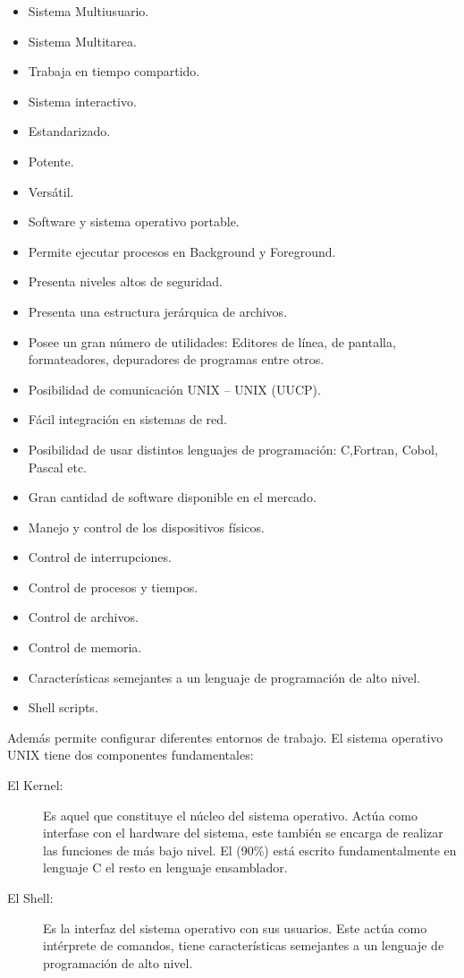\begin{itemize}
	\item Sistema Multiusuario.
	\item Sistema Multitarea.
	\item Trabaja en tiempo compartido.
	\item Sistema interactivo.
	\item Estandarizado.
	\item Potente.
	\item Versátil.
	\item Software y sistema operativo portable.
	\item Permite ejecutar procesos en Background y Foreground.
	\item Presenta niveles altos de seguridad.
	\item Presenta una estructura jerárquica de archivos.
	\item Posee un gran número de utilidades: Editores de línea, de pantalla, formateadores, depuradores de programas entre otros.
	\item Posibilidad de comunicación UNIX – UNIX (UUCP).
	\item Fácil integración en sistemas de red.
	\item Posibilidad de usar distintos lenguajes de programación: C,Fortran, Cobol, Pascal etc.
	\item Gran cantidad de software disponible en el mercado.
	\item Manejo y control de los dispositivos físicos.
	\item Control de interrupciones.
	\item Control de procesos y tiempos.
	\item Control de archivos.
	\item Control de memoria.
	\item Características semejantes a un lenguaje de programación de alto nivel.
	\item Shell scripts.
\end{itemize}

Además permite configurar diferentes entornos de trabajo. El sistema operativo UNIX tiene dos componentes fundamentales:
\begin{description}
	\item[El Kernel:] Es aquel que constituye el núcleo del sistema operativo. Actúa como interfase con el hardware del sistema, este también se encarga de realizar las funciones 
							de más bajo nivel. El (90\%) está escrito fundamentalmente en lenguaje C el resto en lenguaje ensamblador.
	\item[El Shell:] Es la interfaz del sistema operativo con sus usuarios. Este actúa como intérprete de comandos, tiene características semejantes a un lenguaje de programación 
						  de alto nivel.
\end{description}  

